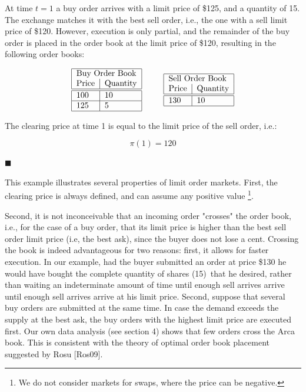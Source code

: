 \documentclass{article}
\begin{document}
At time $t=1$ a buy order arrives with a limit price of \$125, and a
quantity of 15. The exchange matches it with the best sell order, i.e., the
one with a sell limit price of \$120. However, execution is only partial,
and the remainder of the buy order is placed in the order book at the limit
price of \$120, resulting in the following order books:

\begin{equation*}
\begin{tabular}{|l|l|}
\hline
\multicolumn{2}{|l|}{Buy Order Book} \\
Price & Quantity \\ \hline\hline
100 & 10 \\ \hline
125 & 5 \\ \hline
\end{tabular}%
\text{ \ \ \ \ \ }%
\begin{tabular}{|l|l|}
\hline
\multicolumn{2}{|l|}{Sell Order Book} \\
Price & Quantity \\ \hline\hline
130 & 10 \\ \hline
\end{tabular}%
\end{equation*}

The clearing price at time 1 is equal to the limit price of the sell order,
i.e.:

\begin{equation*}
\pi (1)=120
\end{equation*}

$\blacksquare $

This example illustrates several properties of limit order markets. First,
the clearing price is always defined, and can assume any positive value%
\footnote{%
We do not consider markets for swaps, where the price can be negative.}.

Second, it is not inconceivable that an incoming order "crosses" the order
book, i.e., for the case of a buy order, that its limit price is higher than
the best sell order limit price (i.e, the best ask), since the buyer does
not lose a cent. Crossing the book is indeed advantageous for two reasons:
first, it allows for faster execution. In our example, had the buyer
submitted an order at price \$130 he would have bought the complete quantity
of shares (15)\ that he desired, rather than waiting an indeterminate amount
of time until enough sell arrives arrive until enough sell arrives arrive at
his limit price. Second, suppose that several buy orders are submitted at
the same time. In case the demand exceeds the supply at the best ask, the
buy orders with the highest limit price are executed first. Our own data
analysis (see section 4) shows that few orders cross the Arca book. This is
consistent with the theory of optimal order book placement suggested by Rosu
[Ros09].
\end{document}
